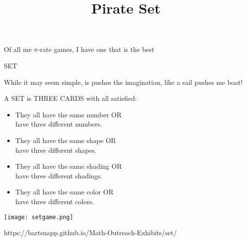 \documentclass{../exhibit}
\title{Pirate Set}
\begin{document}
\begin{context}
  Of all me $\pi$-rate games, I have one that is the best
  



  \vspace{1cm}

  SET


  \vspace{1cm}

  While it may seem simple, is pushes the imagination, like a sail pushes me boat!
\end{context}



\begin{directions}
  A SET is THREE CARDS with all satisfied:\huge
  \begin{itemize}
  \item They all have the same number OR \\have three different numbers.
  \item They all have the same shape OR \\have three different shapes.
  \item They all have the same shading OR\\ have three different shadings.
  \item They all have the same color OR\\ have three different colors.
  \end{itemize}
\end{directions}



\begin{example}%
  \begin{center}
    \texttt{[image: setgame.png]}
  \end{center}
\end{example}




\begin{mathConnections}
  https://bartsnapp.github.io/Math-Outreach-Exhibits/set/
\end{mathConnections}
\end{document}
